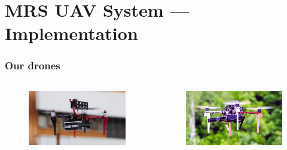 \documentclass[aspectratio=169,9pt]{beamer}
\begin{document}


\section{MRS UAV System --- Implementation}


\begin{frame}
  \frametitle{Our drones}

  \begin{columns}[c]


    \begin{figure}
      \centering
      \includegraphics[width=1.0\textwidth]{./fig/uavs/f330_real.jpg}
    \end{figure}

    \vspace{-1em}

    \begin{figure}
      \centering
      \includegraphics[width=1.0\textwidth]{./fig/uavs/f450_real.jpg}
    \end{figure}


\end{columns}
\end{frame}
\end{document}
